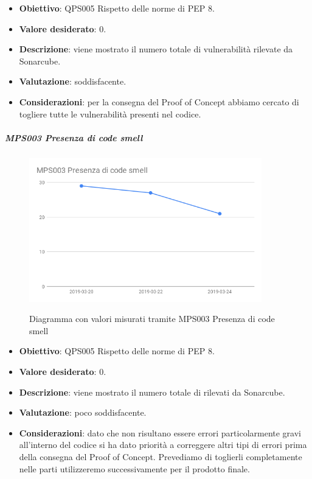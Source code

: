     \begin{itemize}
        \item \textbf{Obiettivo}: QPS005 Rispetto delle norme di PEP 8.
        \item \textbf{Valore desiderato}: 0.
        \item \textbf{Descrizione}: viene mostrato il numero totale di vulnerabilità rilevate da Sonarcube.
        \item \textbf{Valutazione}: soddisfacente.
        \item \textbf{Considerazioni}: per la consegna del Proof of Concept abbiamo cercato di togliere tutte le vulnerabilità presenti nel codice.
    \end{itemize}

    \subparagraph{MPS003 Presenza di code smell}
    
    \begin{figure}[H]
        \centering
        \includegraphics[width=0.9\textwidth]{img/cruscotti/MPS003.png}
        \label{immaginePresenzaCodeSmell}
        \caption{Diagramma con valori misurati tramite MPS003 Presenza di code smell}
    \end{figure}
    
    \begin{itemize}
        \item \textbf{Obiettivo}: QPS005 Rispetto delle norme di PEP 8.
        \item \textbf{Valore desiderato}: 0.
        \item \textbf{Descrizione}: viene mostrato il numero totale di  rilevati da Sonarcube.
        \item \textbf{Valutazione}: poco soddisfacente.
        \item \textbf{Considerazioni}: dato che non risultano essere errori particolarmente gravi all'interno del codice si ha dato priorità a correggere altri tipi di errori prima della consegna del Proof of Concept. Prevediamo di toglierli completamente nelle parti utilizzeremo successivamente per il prodotto finale.
    \end{itemize}

